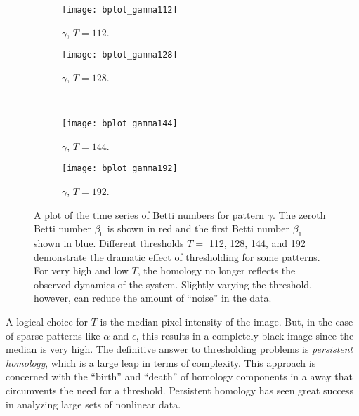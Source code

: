 \begin{figure*}[h]
	\centering
	\begin{subfigure}[b]{0.48\textwidth}
                \texttt{[image: bplot\_gamma112]}
                \caption{$\gamma$, $T = 112$.}
                \label{fig:bplot_gamma112}
        \end{subfigure}
	\begin{subfigure}[b]{0.48\textwidth}
                \texttt{[image: bplot\_gamma128]}
                \caption{$\gamma$, $T = 128$.}
                \label{fig:bplot_gamma128}
        \end{subfigure} \hfill \\
	\begin{subfigure}[b]{0.48\textwidth}
                \texttt{[image: bplot\_gamma144]}
                \caption{$\gamma$, $T = 144$.}
                \label{fig:bplot_gamma144}
       \end{subfigure}
       \begin{subfigure}[b]{0.48\textwidth}
                \texttt{[image: bplot\_gamma192]}
                \caption{$\gamma$, $T = 192$.}
                \label{fig:bplot_gamma192}
        \end{subfigure}
        
        \caption{A plot of the time series of Betti numbers for pattern $\gamma$. The zeroth Betti number $\beta_0$ is shown in red and the first Betti number $\beta_1$ shown in blue. Different thresholds $T =$ 112, 128, 144, and 192 demonstrate the dramatic effect of thresholding for some patterns. For very high and low $T$, the homology no longer reflects the observed dynamics of the system. Slightly varying the threshold, however, can reduce the amount of ``noise'' in the data.} \label{fig:bplots_gamma}
\end{figure*}


A logical choice for $T$ is the median pixel intensity of the image. But, in the case of sparse patterns like $\alpha$ and $\epsilon$, this results in a completely black image since the median is very high. The definitive answer to thresholding problems is \emph{persistent homology}, which is a large leap in terms of complexity. This approach is concerned with the ``birth'' and ``death'' of homology components in a away that circumvents the need for a threshold. Persistent homology has seen great success in analyzing large sets of nonlinear data.

